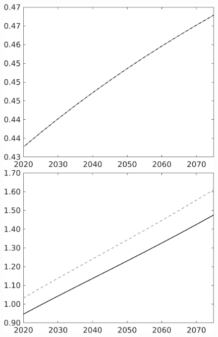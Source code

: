 \documentclass[12pt]{article}
\begin{document}
\begin{figure}[h!!]
\begin{minipage}[]{0.32\textwidth}
	\end{minipage}
\begin{minipage}[]{0.32\textwidth}
\includegraphics[width=1\textwidth]{../../codding_model/own_basedOnFried/optimalPol_010922_revision/figures/all_13Sept22/CompTaul_Equlab_LFBAU_Reg0_EY_spillover0_nsk0_xgr0_knspil1_sep1_countec0_GovRev0_etaa0.79_lgd0.png}
\end{minipage}	
\begin{minipage}[]{0.32\textwidth}
\includegraphics[width=1\textwidth]{../../codding_model/own_basedOnFried/optimalPol_010922_revision/figures/all_13Sept22/CompTaul_Equlab_LFBAU_Reg0_N_spillover0_nsk0_xgr0_knspil1_sep1_countec0_GovRev0_etaa0.79_lgd0.png}
\end{minipage}		
\end{figure}
\end{document}
